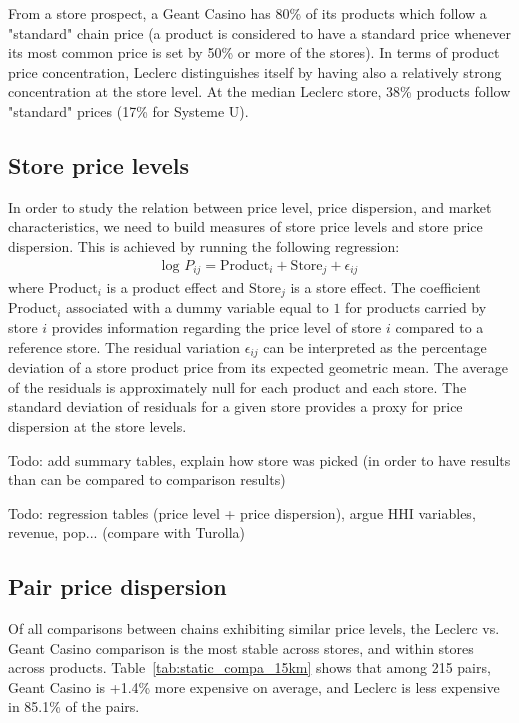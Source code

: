 \documentclass[english]{article}
\begin{document}
From a store prospect, a Geant Casino has 80\% of its products which follow a "standard" chain price (a product is considered to have a standard price whenever its most common price is set by 50\% or more of the stores). In terms of product price concentration, Leclerc distinguishes itself by having also a relatively strong concentration at the store level. At the median Leclerc store, 38\% products follow "standard" prices (17\% for Systeme U).



\subsection{Store price levels}

In order to study the relation between price level, price dispersion, and market characteristics, we need to build measures of store price levels and store price dispersion. This is achieved by running the following regression:
\begin{align*}
\text{log }P_{ij} = \text{Product}_i + \text{Store}_j + \epsilon_{ij}
\end{align*}
where $\text{Product}_i$ is a product effect and $\text{Store}_j$ is a store effect. The coefficient $\text{Product}_i$ associated with a dummy variable equal to $1$ for products carried by store $i$ provides information regarding the price level of store $i$ compared to a reference store. The residual variation $\epsilon_{ij}$ can be interpreted as the percentage deviation of a store product price from its expected geometric mean. The average of the residuals is approximately null for each product and each store. The standard deviation of residuals for a given store provides a proxy for price dispersion at the store levels.

Todo: add summary tables, explain how store was picked (in order to have results than can be compared to comparison results)

Todo: regression tables (price level + price dispersion), argue HHI variables, revenue, pop... (compare with Turolla)

\subsection{Pair price dispersion}

Of all comparisons between chains exhibiting similar price levels, the Leclerc vs. Geant Casino comparison is the most stable across stores, and within stores across products. Table~\ref{tab:static_compa_15km} shows that among 215 pairs, Geant Casino is +1.4\% more expensive on average, and Leclerc is less expensive in 85.1\% of the pairs.
\end{document}
